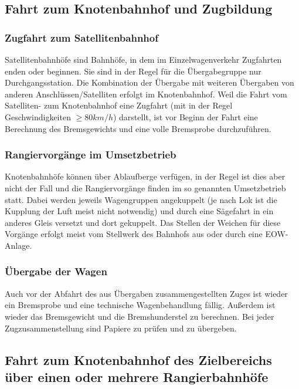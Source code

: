 \subsection{Fahrt zum Knotenbahnhof und Zugbildung}
\subsubsection{Zugfahrt zum Satellitenbahnhof}\label{sec:Zugfahrt}
Satellitenbahnhöfe sind Bahnhöfe, in dem im Einzelwagenverkehr \gls{Zugfahrt}en enden oder beginnen. Sie sind in der Regel für die Übergabegruppe nur Durchgangsstation. Die Kombination der Übergabe mit weiteren Übergaben von anderen Anschlüssen/Satelliten erfolgt im \gls{Knotenbahnhof}. Weil die Fahrt vom Satelliten- zum \gls{Knotenbahnhof} eine \gls{Zugfahrt} (mit in der Regel Geschwindigkeiten $\ge 80 km/h$) darstellt, ist vor Beginn der Fahrt eine Berechnung des Bremsgewichts und eine volle \gls{Bremsprobe} durchzuführen.%
\subsubsection{Rangiervorgänge im Umsetzbetrieb}\label{sec:Rangierfahrt}
Knotenbahnhöfe können über \gls{Ablaufberg}e verfügen, in der Regel ist dies aber nicht der Fall und die Rangiervorgänge finden im so genannten Umsetzbetrieb statt. Dabei werden jeweils Wagengruppen angekuppelt (je nach Lok ist die Kupplung der Luft meist nicht notwendig) und durch eine Sägefahrt in ein anderes Gleis versetzt und dort gekuppelt. Das Stellen der Weichen für diese Vorgänge erfolgt meist vom Stellwerk des Bahnhofs aus oder durch eine \gls{EOW}-Anlage.
\subsubsection{Übergabe der Wagen}\label{sec:UEdWagen}
Auch vor der Abfahrt des aus Übergaben zusammengestellten Zuges ist wieder ein \gls{Bremsprobe} und eine technische Wagenbehandlung fällig. Außerdem ist wieder das Bremsgewicht und die Bremshunderstel zu berechnen. Bei jeder Zugzusammenstellung sind Papiere zu prüfen und zu übergeben.

\subsection{Fahrt zum Knotenbahnhof des Zielbereichs über einen oder mehrere Rangierbahnhöfe}
